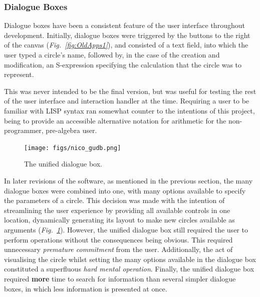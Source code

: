 \documentclass[12pt,twoside,notitlepage,xetex]{report}
\begin{document}
\subsubsection{Dialogue Boxes}

Dialogue boxes have been a consistent feature of the user interface throughout development.  Initially, dialogue boxes were triggered by the buttons to the right of the canvas (\emph{Fig.~\ref{fig:OldApps1}}), and consisted of a text field, into which the user typed a circle's name, followed by, in the case of the creation and modification, an S-expression specifying the calculation that the circle was to represent.

This was never intended to be the final version, but was useful for testing the rest of the user interface and interaction handler at the time.  Requiring a user to be familiar with LISP syntax ran somewhat counter to the intentions of this project, being to provide an accessible alternative notation for arithmetic for the non-programmer, pre-algebra user.

\begin{center}
\begin{figure}[H]
\begin{center}
\texttt{[image: figs/nico\_gudb.png]}
\end{center}
\caption{The unified dialogue box.}
\label{fig:GUDB}
\end{figure}
\end{center}

In later revisions of the software, as mentioned in the previous section, the many dialogue boxes were combined into one, with many options available to specify the parameters of a circle.  This decision was made with the intention of streamlining the user experience by providing all available controls in one location, dynamically generating its layout to make new circles available as arguments (\emph{Fig.~\ref{fig:GUDB}}).  However, the unified dialogue box still required the user to perform operations without the consequences being obvious.  This required unnecessary \emph{premature commitment} from the user.  Additionally, the act of visualising the circle whilst setting the many options available in the dialogue box constituted a superfluous \emph{hard mental operation}.  Finally, the unified dialogue box required {\bf more} time to search for information than several simpler dialogue boxes, in which less information is presented at once.
\end{document}
